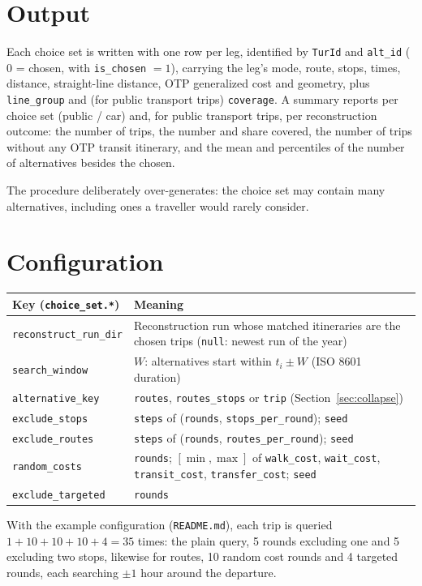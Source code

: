 \documentclass[11pt,a4paper]{article}
\newcommand{\code}[1]{\texttt{#1}}
\begin{document}
\section{Output}

Each choice set is written with one row per leg, identified by \code{TurId} and \code{alt\_id}
($0$ = chosen, with \code{is\_chosen} $=1$), carrying the leg's mode, route, stops, times, distance,
straight-line distance, OTP generalized cost and geometry, plus \code{line\_group} and (for public
transport trips) \code{coverage}. A summary reports per choice set (public / car) and, for public
transport trips, per reconstruction outcome: the number of trips, the number and share covered, the
number of trips without any OTP transit itinerary, and the mean and percentiles of the number of
alternatives besides the chosen.

The procedure deliberately over-generates: the choice set may contain many alternatives, including
ones a traveller would rarely consider.

\section{Configuration}

\begin{center}
\begin{tabularx}{\linewidth}{@{}lX@{}}
\toprule
Key (\code{choice\_set.*}) & Meaning \\
\midrule
\code{reconstruct\_run\_dir} & Reconstruction run whose matched itineraries are the chosen trips
  (\code{null}: newest run of the year) \\
\code{search\_window} & $W$: alternatives start within $t_i \pm W$ (ISO 8601 duration) \\
\code{alternative\_key} & \code{routes}, \code{routes\_stops} or \code{trip} (Section~\ref{sec:collapse}) \\
\code{exclude\_stops} & \code{steps} of (\code{rounds}, \code{stops\_per\_round}); \code{seed} \\
\code{exclude\_routes} & \code{steps} of (\code{rounds}, \code{routes\_per\_round}); \code{seed} \\
\code{random\_costs} & \code{rounds}; $[\min,\max]$ of \code{walk\_cost}, \code{wait\_cost},
  \code{transit\_cost}, \code{transfer\_cost}; \code{seed} \\
\code{exclude\_targeted} & \code{rounds} \\
\bottomrule
\end{tabularx}
\end{center}

With the example configuration (\code{README.md}), each trip is queried $1 + 10 + 10 + 10 + 4 = 35$
times: the plain query, 5 rounds excluding one and 5 excluding two stops, likewise for routes, 10
random cost rounds and 4 targeted rounds, each searching $\pm 1$ hour around the departure.
\end{document}
